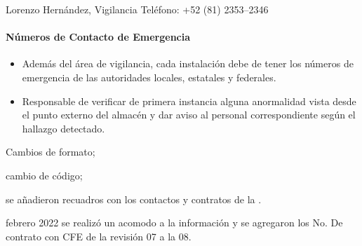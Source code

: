 Lorenzo Hernández, Vigilancia
Teléfono: +52 (81) 2353--2346

\paragraph{Números de Contacto de Emergencia}
\begin{itemize}
	\item Además del área de vigilancia, cada instalación debe de tener los números de emergencia de las autoridades locales, estatales y federales.
	\item Responsable de verificar de primera instancia alguna anormalidad vista desde el punto externo del almacén y dar aviso al personal correspondiente según el hallazgo detectado.
\end{itemize}

\begin{changelog}[simple, sectioncmd=\subsection*,label=changelog-2.12]
	\begin{version}[v=2.0, date=2023--01, author=Pablo E. Alanis]
		\item Cambios de formato;
		\item cambio de código;
		\item se añadieron recuadros con los contactos y contratos de la .
	\end{version}

	\begin{version}[v=1.9, date=2022--01, author=Agustín M.]
		\item febrero 2022 se realizó un acomodo a la información y se agregaron los No. De contrato con CFE de la revisión 07 a la 08.
	\end{version}
\end{changelog}
